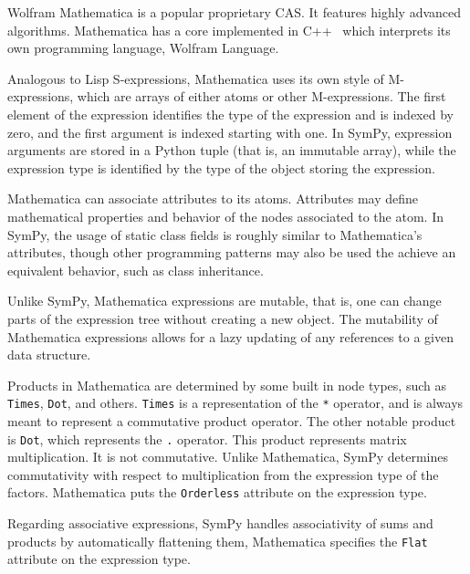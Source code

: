 
Wolfram Mathematica is a popular proprietary CAS\@.
It features highly advanced algorithms.
Mathematica has a core implemented in C++~\cite{Wolfram2003book}
which interprets its own programming language, Wolfram Language.


Analogous to Lisp S-expressions,
Mathematica uses its own style of M-expres\-sions,
which are arrays of either atoms or other M-expressions.
The first element of the expression identifies the type of the expression
and is indexed by zero, and the first argument is indexed starting with one.
In SymPy, expression arguments are stored in a Python tuple
(that is, an immutable array),
while the expression type is identified by the type of the object storing the
expression.


Mathematica can associate attributes to its atoms.
Attributes may define mathematical properties and behavior of the nodes
associated to the atom.
In SymPy, the usage of static class fields is roughly similar to Mathematica's
attributes, though other programming patterns may also be used the achieve an
equivalent behavior, such as class inheritance.


Unlike SymPy, Mathematica expressions are mutable,
that is, one can change parts of the expression tree without
creating a new object.
The mutability of Mathematica expressions allows for a lazy updating of any references
to a given data structure.


Products in Mathematica are determined by some built in node types, such as
\texttt{Times}, \texttt{Dot}, and others.  \texttt{Times} is a representation of
the \texttt{*} operator, and is always meant to represent a commutative product
operator.  The other notable product is \texttt{Dot}, which represents the
\texttt{.} operator.  This product represents matrix multiplication. It is not
commutative.  Unlike
Mathematica, SymPy determines commutativity with respect to multiplication from
the expression type of the factors.  Mathematica puts the \texttt{Orderless} attribute
on the expression type.


Regarding associative expressions,
SymPy handles associativity of sums and products by automatically flattening them,
Mathematica specifies the \texttt{Flat}~\cite{WolframRefFlat} attribute on the expression type.

